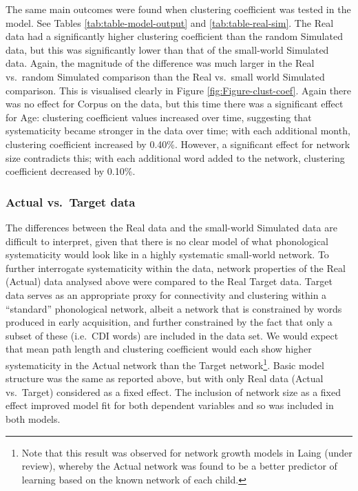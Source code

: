 \documentclass[
  man]{apa6}
\begin{document}
The same main outcomes were found when clustering coefficient was tested in the model. See Tables \ref{tab:table-model-output} and \ref{tab:table-real-sim}. The Real data had a significantly higher clustering coefficient than the random Simulated data, but this was significantly lower than that of the small-world Simulated data. Again, the magnitude of the difference was much larger in the Real vs.~random Simulated comparison than the Real vs.~small world Simulated comparison. This is visualised clearly in Figure \ref{fig:Figure-clust-coef}. Again there was no effect for Corpus on the data, but this time there was a significant effect for Age: clustering coefficient values increased over time, suggesting that systematicity became stronger in the data over time; with each additional month, clustering coefficient increased by 0.40\%. However, a significant effect for network size contradicts this; with each additional word added to the network, clustering coefficient decreased by 0.10\%.

\hypertarget{actual-vs.-target-data}{%
\subsubsection{Actual vs.~Target data}\label{actual-vs.-target-data}}

The differences between the Real data and the small-world Simulated data are difficult to interpret, given that there is no clear model of what phonological systematicity would look like in a highly systematic small-world network. To further interrogate systematicity within the data, network properties of the Real (Actual) data analysed above were compared to the Real Target data. Target data serves as an appropriate proxy for connectivity and clustering within a ``standard'' phonological network, albeit a network that is constrained by words produced in early acquisition, and further constrained by the fact that only a subset of these (i.e.~CDI words) are included in the data set. We would expect that mean path length and clustering coefficient would each show higher systematicity in the Actual network than the Target network\footnote{Note that this result was observed for network growth models in Laing (under review), whereby the Actual network was found to be a better predictor of learning based on the known network of each child.}. Basic model structure was the same as reported above, but with only Real data (Actual vs.~Target) considered as a fixed effect. The inclusion of network size as a fixed effect improved model fit for both dependent variables and so was included in both models.
\end{document}
